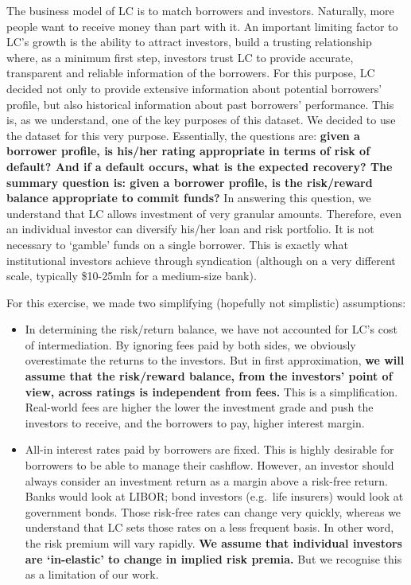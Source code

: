 \documentclass[11pt,]{report}
\begin{document}
The business model of LC is to match borrowers and investors. Naturally, more people want to receive money than part with it. An important limiting factor to LC's growth is the ability to attract investors, build a trusting relationship where, as a minimum first step, investors trust LC to provide accurate, transparent and reliable information of the borrowers. For this purpose, LC decided not only to provide extensive information about potential borrowers' profile, but also historical information about past borrowers' performance. This is, as we understand, one of the key purposes of this dataset. We decided to use the dataset for this very purpose. Essentially, the questions are: \textbf{given a borrower profile, is his/her rating appropriate in terms of risk of default? And if a default occurs, what is the expected recovery? The summary question is: given a borrower profile, is the risk/reward balance appropriate to commit funds?} In answering this question, we understand that LC allows investment of very granular amounts. Therefore, even an individual investor can diversify his/her loan and risk portfolio. It is not necessary to `gamble' funds on a single borrower. This is exactly what institutional investors achieve through syndication (although on a very different scale, typically \$10-25mln for a medium-size bank).

For this exercise, we made two simplifying (hopefully not simplistic) assumptions:

\begin{itemize}
\item
  In determining the risk/return balance, we have not accounted for LC's cost of intermediation. By ignoring fees paid by both sides, we obviously overestimate the returns to the investors. But in first approximation, \textbf{we will assume that the risk/reward balance, from the investors' point of view, across ratings is independent from fees.} This is a simplification. Real-world fees are higher the lower the investment grade and push the investors to receive, and the borrowers to pay, higher interest margin.
\item
  All-in interest rates paid by borrowers are fixed. This is highly desirable for borrowers to be able to manage their cashflow. However, an investor should always consider an investment return as a margin above a risk-free return. Banks would look at LIBOR; bond investors (e.g.~life insurers) would look at government bonds. Those risk-free rates can change very quickly, whereas we understand that LC sets those rates on a less frequent basis. In other word, the risk premium will vary rapidly. \textbf{We assume that individual investors are `in-elastic' to change in implied risk premia.} But we recognise this as a limitation of our work.
\end{itemize}
\end{document}
